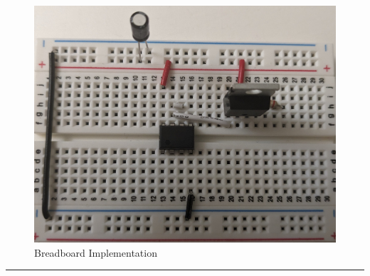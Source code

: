 \documentclass[a4paper,11pt]{article}%
\begin{document}
\begin{figure}[H]
	\centering
	\includegraphics[scale=0.12]{figures/breadboard.jpg}
	\caption{Breadboard Implementation}
	\label{breadboard}
\end{figure}

\hrule






\end{document}
